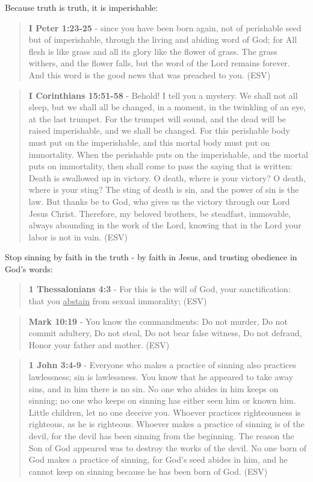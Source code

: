 \documentclass[11pt]{article}
\begin{document}
Because truth is truth, it is imperishable:

\begin{quote}
\textbf{I Peter 1:23-25} - since you have been born again, not of perishable seed but of imperishable, through the living and abiding word of God; for All flesh is like grass and all its glory like the flower of grass. The grass withers, and the flower falls, but the word of the Lord remains forever. And this word is the good news that was preached to you. (ESV)
\end{quote}

\begin{quote}
\textbf{I Corinthians 15:51-58} - Behold! I tell you a mystery. We shall not all sleep, but we shall all be changed, in a moment, in the twinkling of an eye, at the last trumpet. For the trumpet will sound, and the dead will be raised imperishable, and we shall be changed. For this perishable body must put on the imperishable, and this mortal body must put on immortality. When the perishable puts on the imperishable, and the mortal puts on immortality, then shall come to pass the saying that is written: Death is swallowed up in victory. O death, where is your victory? O death, where is your sting? The sting of death is sin, and the power of sin is the law. But thanks be to God, who gives us the victory through our Lord Jesus Christ. Therefore, my beloved brothers, be steadfast, immovable, always abounding in the work of the Lord, knowing that in the Lord your labor is not in vain. (ESV)
\end{quote}

Stop sinning by faith in the truth - by faith in Jesus, and trusting obedience in God's words:

\begin{quote}
\textbf{1 Thessalonians 4:3} -  For this is the will of God, your sanctification: that you \uline{abstain} from sexual immorality;  (ESV)
\end{quote}

\begin{quote}
\textbf{Mark 10:19} - You know the commandments: Do not murder, Do not commit adultery, Do not steal, Do not bear false witness, Do not defraud, Honor your father and mother. (ESV)
\end{quote}

\begin{quote}
\textbf{1 John 3:4-9} - Everyone who makes a practice of sinning also practices lawlessness; sin is lawlessness.  You know that he appeared to take away sins, and in him there is no sin.  No one who abides in him keeps on sinning; no one who keeps on sinning has either seen him or known him.  Little children, let no one deceive you.  Whoever practices righteousness is righteous, as he is righteous.  Whoever makes a practice of sinning is of the devil, for the devil has been sinning from the beginning.  The reason the Son of God appeared was to destroy the works of the devil.  No one born of God makes a practice of sinning, for God's seed abides in him, and he cannot keep on sinning because he has been born of God.  (ESV)
\end{quote}
\end{document}

